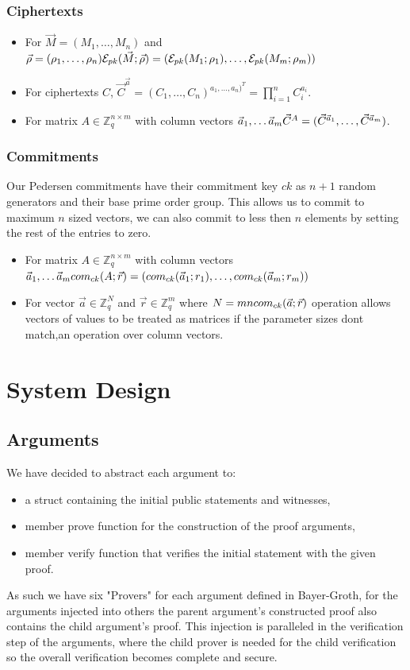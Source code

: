 \documentclass[12pt,a4paper]{report}
\begin{document}
\subsubsection{Ciphertexts}
\begin{itemize}
	\item For $\vec{M} = (M_1,\ldots,M_n)$ and $\vec{\rho} = (\rho_1,\ldots,\rho_n)\\ \mathcal{E}_{pk}(\vec{M}; \vec{\rho}) = (\mathcal{E}_{pk}(M_1;\rho_1),\ldots,\mathcal{E}_{pk}(M_m;\rho_m))$
	\item For ciphertexts $C$, $\displaystyle \vec{C}^{\vec{a}} = (C_1,\ldots,C_n)^{a_1,\ldots,a_n)^T} = \prod_{i=1}^n C_i^{a_i}$.
	\item For matrix $A \in \mathbb{Z}^{n \times m}_q$ with column vectors $\vec{a}_1,\ldots\vec{a}_m\\ \vec{C}^A = (\vec{C}^{\vec{a}_1},\ldots,\vec{C}^{\vec{a}_m})$.
\end{itemize}
\subsubsection{Commitments}
Our Pedersen commitments have their commitment key $ck$ as $n+1$ random generators and their base prime order group. 
This allows us to commit to maximum $n$ sized vectors, we can also commit to less then $n$ elements by setting the rest of the entries to zero.
\begin{itemize}
	\item For matrix $A \in \mathbb{Z}^{n \times m}_q$ with column vectors $\vec{a}_1,\ldots\vec{a}_m\\ com_{ck}(A; \vec{r}) = (com_{ck}(\vec{a}_1;r_1),\ldots,com_{ck}(\vec{a}_m; r_m))$
	\item For vector $\vec{a} \in \mathbb{Z}_q^N$ and $\vec{r} \in \mathbb{Z}_q^m$ where $N = mn\\ com_{ck}(\vec{a};\vec{r})$ operation allows vectors of values to be treated as matrices if the parameter sizes dont match,an operation over column vectors.
\end{itemize}
\section{System Design}
\subsection*{Arguments}
We have decided to abstract each argument to:
\begin{itemize}
	\item a struct containing the initial public statements and witnesses,
	\item member prove function for the construction of the proof arguments,
	\item member verify function that verifies the initial statement with the given proof.
\end{itemize}
As such we have six "Provers" for each argument defined in Bayer-Groth, for the arguments injected into others the parent argument's constructed proof also contains the child argument's proof. 
This injection is paralleled in the verification step of the arguments, where the child prover is needed for the child verification so the overall verification becomes complete and secure.
\end{document}
